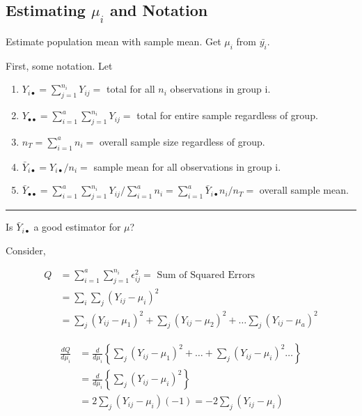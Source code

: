 \documentclass[10pt]{article}
\newcommand{\mean}[1]{\mu_{#1}}
\newcommand{\err}[1]{\epsilon_{#1}}
\newcommand{\drawline}{\noindent\rule{\linewidth}{0.1pt}}
\begin{document}
\begin{multicols}{3}
    \subsection{Estimating \texorpdfstring{$\mean{i}$}{mui} and Notation}

    Estimate population mean with sample mean. Get $\mean{i}$ from $\bar{y_{i}}$.

    First, some notation. Let

    \begin{enumerate}
        \item $Y_{i\bullet} = \sum_{j=1}^{n_i} Y_{ij}=$ total for all $n_i$ observations in group i.
        \item $Y_{\bullet\bullet} = \sum_{i=1}^{a} \sum_{j=1}^{n_i} Y_{ij}=$ total for entire sample regardless of group.
        \item $n_{T} = \sum_{i=1}^a n_i =$ overall sample size regardless of group.
        \item $\bar Y_{i\bullet} = Y_{i\bullet}/n_i=$ sample mean for all observations in group i.
        \item $\bar Y_{\bullet\bullet} = \sum_{i=1}^a \sum_{j=1}^{n_i} Y_{ij}/\sum_{i=1}^a n_i = \sum_{i=1}^a \bar Y_{i\bullet} n_i / n_T =$  overall sample mean.
    \end{enumerate}

    \drawline

    Is $\bar Y_{i\bullet}$ a good estimator for $\mu$?

    Consider,

    \begin{align*}
        Q & = \sum_{i=1}^a \sum_{j=1}^{n_i} \err{ij}^2 = \text{ Sum of Squared Errors} \\
            & = \sum_i \sum_j (Y_{ij} - \mean{i})^2 \\
            & = \sum_j (Y_{ij} - \mean{1})^2 + \sum_j (Y_{ij} - \mean{2})^2  + \dots \sum_j (Y_{ij} - \mean{a})^2 
    \end{align*}

    \begin{align*}
        \frac{dQ}{d\mean{i}} & = \frac{d}{d\mean{i}} \left\{\sum_j (Y_{ij} - \mean{1})^2 +\dots+ \sum_j (Y_{ij} - \mean{i})^2  \dots \right\} \\
            & = \frac{d}{d\mean{i}} \left\{\sum_j (Y_{ij} - \mean{i})^2 \right\} \\
            & = 2\sum_j (Y_{ij} - \mean{i}) (-1) = -2 \sum_j (Y_{ij} - \mean{i})     
    \end{align*}


\end{multicols}
\end{document}
